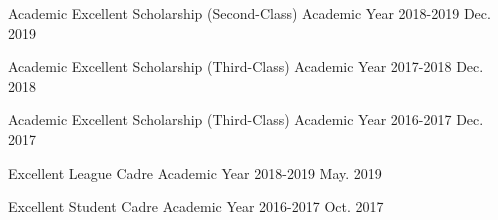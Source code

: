 




\begin{cvhonors}


    \cvhonor
    {Academic Excellent Scholarship (Second-Class)} %
    {Academic Year 2018-2019} %
    {} %
    {Dec. 2019} %


    \cvhonor
    {Academic Excellent Scholarship (Third-Class)} %
    {Academic Year 2017-2018} %
    {} %
    {Dec. 2018} %


    \cvhonor
    {Academic Excellent Scholarship (Third-Class)} %
    {Academic Year 2016-2017} %
    {} %
    {Dec. 2017} %


\end{cvhonors}




\begin{cvhonors}


    \cvhonor
    {Excellent League Cadre} %
    {Academic Year 2018-2019} %
    {} %
    {May. 2019} %
    

    \cvhonor
    {Excellent Student Cadre} %
    {Academic Year 2016-2017} %
    {} %
    {Oct. 2017} %


\end{cvhonors}